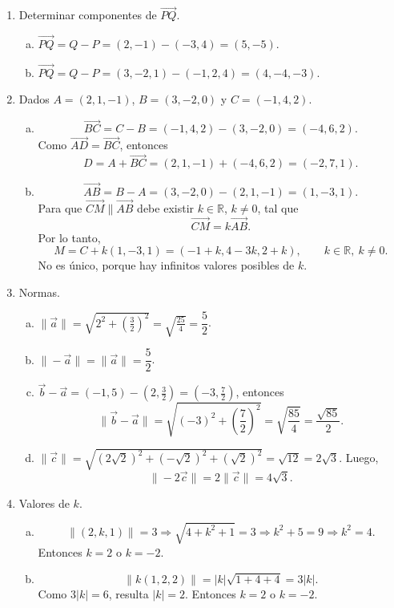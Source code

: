 \begin{enumerate}[\hspace{-3mm}$1)$]
\item Determinar componentes de $\overrightarrow{PQ}$.
\begin{sol}
\begin{enumerate}[a)]
\item $\overrightarrow{PQ}=Q-P=(2,-1)-(-3,4)=(5,-5)$.
\item $\overrightarrow{PQ}=Q-P=(3,-2,1)-(-1,2,4)=(4,-4,-3)$.
\end{enumerate}
\end{sol}

\item Dados $A=(2,1,-1)$, $B=(3,-2,0)$ y $C=(-1,4,2)$.
\begin{sol}
\begin{enumerate}[a)]
\item
\[
\overrightarrow{BC}=C-B=(-1,4,2)-(3,-2,0)=(-4,6,2).
\]
Como $\overrightarrow{AD}=\overrightarrow{BC}$, entonces
\[
D=A+\overrightarrow{BC}=(2,1,-1)+(-4,6,2)=(-2,7,1).
\]
\item
\[
\overrightarrow{AB}=B-A=(3,-2,0)-(2,1,-1)=(1,-3,1).
\]
Para que $\overrightarrow{CM}\parallel \overrightarrow{AB}$ debe existir $k\in\mathbb R$, $k\neq0$, tal que
\[
\overrightarrow{CM}=k\overrightarrow{AB}.
\]
Por lo tanto,
\[
M=C+k(1,-3,1)=(-1+k,4-3k,2+k),\qquad k\in\mathbb R,\ k\neq0.
\]
No es único, porque hay infinitos valores posibles de $k$.
\end{enumerate}
\end{sol}

\item Normas.
\begin{sol}
\begin{enumerate}[a)]
\item $\|\vec a\|=\sqrt{2^2+\left(\frac32\right)^2}=\sqrt{\frac{25}{4}}=\dfrac52$.
\item $\|-\vec a\|=\|\vec a\|=\dfrac52$.
\item $\vec b-\vec a=(-1,5)-\left(2,\frac32\right)=\left(-3,\frac72\right)$, entonces
\[
\|\vec b-\vec a\|=\sqrt{(-3)^2+\left(\frac72\right)^2}=\sqrt{\frac{85}{4}}=\frac{\sqrt{85}}{2}.
\]
\item $\|\vec c\|=\sqrt{(2\sqrt2)^2+(-\sqrt2)^2+(\sqrt2)^2}=\sqrt{12}=2\sqrt3$. Luego,
\[
\|-2\vec c\|=2\|\vec c\|=4\sqrt3.
\]
\end{enumerate}
\end{sol}

\item Valores de $k$.
\begin{sol}
\begin{enumerate}[a)]
\item
\[
\|(2,k,1)\|=3\Rightarrow \sqrt{4+k^2+1}=3\Rightarrow k^2+5=9\Rightarrow k^2=4.
\]
Entonces $\boxed{k=2\text{ o }k=-2}$.
\item
\[
\|k(1,2,2)\|=|k|\sqrt{1+4+4}=3|k|.
\]
Como $3|k|=6$, resulta $|k|=2$. Entonces $\boxed{k=2\text{ o }k=-2}$.
\end{enumerate}
\end{sol}


\end{enumerate}

